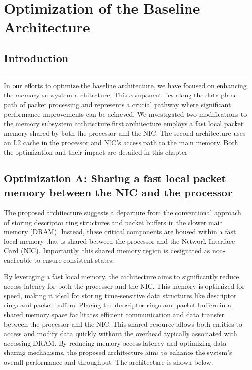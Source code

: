 \documentclass[12pt]{report}
\begin{document}
\chapter{Optimization of the Baseline Architecture}
\section{Introduction}
\rule[10pt]{\linewidth}{3pt}

In our efforts to optimize the baseline architecture, we have focused on enhancing the memory subsystem architecture. This component lies along the data plane path of packet processing and represents a crucial pathway where significant performance improvements can be achieved. We
investigated two modifications to the memory subsystem architecture first architecture employs a fast local packet memory shared by both the processor and the NIC. The second architecture uses an L2 cache in the processor and NIC's access path to the main memory. Both the optimization and their impact are detailed in this chapter

\section{Optimization A: Sharing a fast local packet memory between the NIC and the processor}

The proposed architecture suggests a departure from the conventional approach of storing descriptor ring structures and packet buffers in the slower main memory (DRAM). Instead, these critical components are housed within a fast local memory that is shared between the processor and the Network Interface Card (NIC). Importantly, this shared memory region is designated as non-cacheable to ensure consistent states.

By leveraging a fast local memory, the architecture aims to significantly reduce access latency for both the processor and the NIC. This memory is optimized for speed, making it ideal for storing time-sensitive data structures like descriptor rings and packet buffers.
Placing the descriptor rings and packet buffers in a shared memory space facilitates efficient communication and data transfer between the processor and the NIC. This shared resource allows both entities to access and modify data quickly without the overhead typically associated with accessing DRAM. By reducing memory access latency and optimizing data-sharing mechanisms, the proposed architecture aims to enhance the system's overall performance and throughput. The architecture is shown below.
\end{document}
